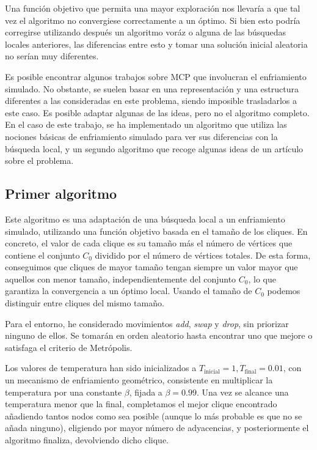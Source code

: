 Una función objetivo que permita una mayor exploración nos llevaría a que tal vez el algoritmo no
convergiese correctamente a un óptimo. Si bien esto podría corregirse utilizando después un algoritmo
voráz o alguna de las búsquedas locales anteriores, las diferencias entre esto y tomar una solución
inicial aleatoria no serían muy diferentes.

Es posible encontrar algunos trabajos sobre MCP que involucran el enfriamiento simulado. No obstante,
se suelen basar en una representación y una estructura diferentes a las consideradas en este problema,
siendo imposible trasladarlos a este caso. Es posible adaptar algunas de las ideas, pero no el algoritmo
completo. En el caso de este trabajo, se ha implementado un algoritmo que utiliza las nociones
básicas de enfriamiento simulado para ver sus diferencias con la búsqueda local, y un segundo algoritmo
que recoge algunas ideas de un artículo sobre el problema.

\subsection{Primer algoritmo}

Este algoritmo es una adaptación de una búsqueda local a un enfriamiento simulado, utilizando una función
objetivo basada en el tamaño de los cliques. En concreto, el valor de cada clique es su tamaño más el número
de vértices que contiene el conjunto $C_0$ dividido por el número de vértices totales. De esta forma,
conseguimos que cliques de mayor tamaño tengan siempre un valor mayor que aquellos con menor tamaño, independientemente
del conjunto $C_0$, lo que garantiza la convergencia a un óptimo local. Usando el tamaño de $C_0$ podemos
distinguir entre cliques del mismo tamaño.

Para el entorno, he considerado movimientos \textit{add}, \textit{swap} y \textit{drop}, sin priorizar
ninguno de ellos. Se tomarán en orden aleatorio hasta encontrar uno que mejore o satisfaga el criterio de
Metrópolis.

Los valores de temperatura han sido inicializados a $T_{\text{inicial}} = 1, T_{\text{final}} = 0.01$, con un
mecanismo de enfriamiento geométrico, consistente en multiplicar la temperatura por una constante $\beta$, fijada a
$\beta = 0.99$. Una vez se alcance una temperatura menor que la final, completamos el mejor clique encontrado añadiendo
tantos nodos como sea posible (aunque lo más probable es que no se añada ninguno), eligiendo por mayor número de
adyacencias, y posteriormente el algoritmo finaliza, devolviendo dicho clique.

